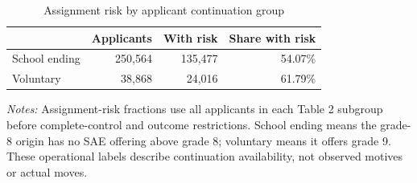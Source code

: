 \begin{table}[!htbp]
\centering
\caption{Assignment risk by applicant continuation group}
\label{tab:assignment-risk-by-continuation}
\begin{tabular}{lrrr}
\toprule
 & Applicants & With risk & Share with risk \\
\midrule
School ending & 250,564 & 135,477 & 54.07\% \\
Voluntary & 38,868 & 24,016 & 61.79\% \\
\bottomrule
\end{tabular}
\par\medskip\footnotesize
\begin{minipage}{\textwidth}
\textit{Notes:} Assignment-risk fractions use all applicants in each Table 2 subgroup before complete-control and outcome restrictions. School ending means the grade-8 origin has no SAE offering above grade 8; voluntary means it offers grade 9. These operational labels describe continuation availability, not observed motives or actual moves.
\end{minipage}
\end{table}
